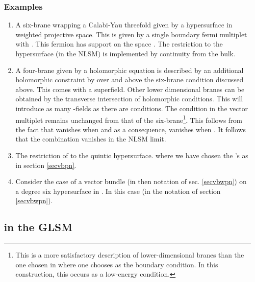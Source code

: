 \documentclass[a4paper,12pt]{article}
\begin{document}
\subsubsection{Examples}
\begin{enumerate}
\item A six-brane wrapping a Calabi-Yau threefold given by
a hypersurface \coordHE{} in weighted projective space. This is given by
a single boundary fermi multiplet with \coordHE{}.  This fermion
has support on the space \coordHE{}. The restriction to the hypersurface (in
the NLSM) is implemented by continuity from the bulk.
\item A four-brane given by a holomorphic equation
\coordHE{} is described by an additional holomorphic constraint 
by  \coordHE{} over and above the six-brane condition
discussed above. This \coordHE{} comes with a \coordHE{} superfield.
Other lower dimensional branes can be obtained by the transverse
intersection of holomorphic conditions. This will introduce
as many \coordHE{}-fields as there are conditions. 
The condition in
the vector multiplet remains unchanged from that of the
six-brane\footnote{This is a more satisfactory description of
lower-dimensional branes than the one chosen in \cite{lsmone}
where one chooses \coordHE{} as the boundary condition. In
this construction, this occurs as a low-energy condition.}.
This follows from the fact that \myHighlight{$\pi$}\coordHE{} vanishes when \coordHE{} 
and as a consequence, \coordHE{} vanishes when \coordHE{}. It follows
that the combination \coordHE{} vanishes in the NLSM limit.
\item  The restriction of \coordHE{} to the quintic hypersurface.
where we have chosen the \coordHE{}'s as in section \ref{secvbpn}.
\item Consider the case of a vector bundle \coordHE{} (in then notation of
sec. \ref{secvbwpn}) on a degree six hypersurface
in \coordHE{}.  
In this case \coordHE{} (in the notation of section  \ref{secvbwpn}). 
\end{enumerate}

\subsection{\coordHE{} in the GLSM}
\end{document}
